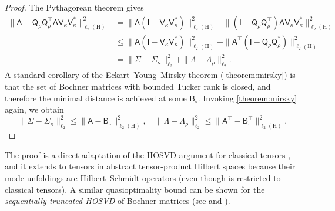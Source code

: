 \documentclass[onefignum,onetabnum]{siamart250211}
\renewenvironment{equation*}{\[}{\]\ignorespacesafterend}
\newcommand{\Hilb}{\mathrm{H}}
\newcommand{\Batrix}[1]{\bm{\Matrix{#1}}}
\newcommand{\Matrix}[1]{\mathsf{#1}}
\newcommand{\trans}{\intercal}
\newcommand{\Norm}[3][]{#1\| #2 #1\|_{\mathrm{#3}}}
\begin{document}
\begin{proof}
The Pythagorean theorem gives
\begin{align*}
    \Norm{\Batrix{A} - \overline{\Matrix{Q}}_\rho \Matrix{Q}_\rho^\trans \Batrix{A} \Matrix{V}_\kappa \Matrix{V}_\kappa^\ast}{\ell_2(\Hilb)}^2 &= \Norm{\Batrix{A} (\Matrix{I} - \Matrix{V}_\kappa \Matrix{V}_\kappa^\ast)}{\ell_2(\Hilb)}^2 + \Norm{(\Matrix{I} - \overline{\Matrix{Q}}_\rho \Matrix{Q}_\rho^\trans) \Batrix{A} \Matrix{V}_\kappa \Matrix{V}_\kappa^\ast}{\ell_2(\Hilb)}^2 \\
    &\leq \Norm{\Batrix{A} (\Matrix{I} - \Matrix{V}_\kappa \Matrix{V}_\kappa^\ast)}{\ell_2(\Hilb)}^2 + \Norm{\Batrix{A}^\trans (\Matrix{I} - \Matrix{Q}_\rho \Matrix{Q}_\rho^\ast)}{\ell_2(\Hilb)}^2 \\
    &= \Norm{\Matrix{\Sigma} - \Matrix{\Sigma}_\kappa}{\ell_2}^2 + \Norm{\Matrix{\Lambda} - \Matrix{\Lambda}_\rho}{\ell_2}^2.
\end{align*}
A standard corollary of the Eckart--Young--Mirsky theorem (\cref{theorem:mirsky}) is that the set of Bochner matrices with bounded Tucker rank is closed, and therefore the minimal distance is achieved at some $\Batrix{B}_{\circ}$.
Invoking \cref{theorem:mirsky} again, we obtain
\begin{equation*}
    \Norm{\Matrix{\Sigma} - \Matrix{\Sigma}_\kappa}{\ell_2}^2 \leq \Norm{\Batrix{A} - \Batrix{B}_{\circ}}{\ell_2(\Hilb)}^2, \quad \Norm{\Matrix{\Lambda} - \Matrix{\Lambda}_\rho}{\ell_2}^2 \leq \Norm{\Batrix{A}^\trans - \Batrix{B}_{\circ}^\trans}{\ell_2(\Hilb)}^2.
\end{equation*}
\end{proof}

The proof is a direct adaptation of the HOSVD argument for classical tensors \cite{de2000multilinear}, and it extends to tensors in abstract tensor-product Hilbert spaces because their mode unfoldings are Hilbert--Schmidt operators (even though \cite[Thm.~10.3]{hackbusch2019tensor} is restricted to classical tensors). 
A similar quasioptimality bound can be shown for the \emph{sequentially truncated HOSVD} of Bochner matrices (see \cite{vannieuwenhoven2012new} and \cite[Thm.~10.5]{hackbusch2019tensor}).
\end{document}
